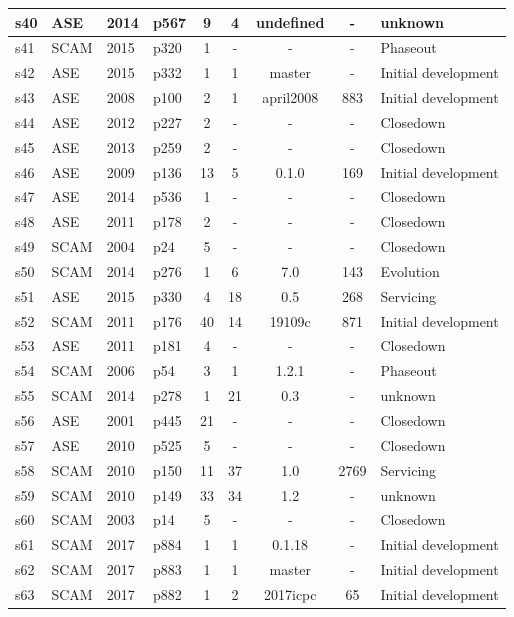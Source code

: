 \begin{longtable}{| l | l | l | l | c | c | c | c | l |}
    \hline
s40 & ASE & 2014 & p567 & 9 & 4 & undefined & - & unknown \\
    \hline
s41 & SCAM & 2015 & p320 & 1 & - & - & - & Phaseout \\
    \hline
s42 & ASE & 2015 & p332 & 1 & 1 & master & - & Initial development \\
    \hline
s43 & ASE & 2008 & p100 & 2 & 1 & april2008 & 883 & Initial development \\
    \hline
s44 & ASE & 2012 & p227 & 2 & - & - & - & Closedown \\
    \hline
s45 & ASE & 2013 & p259 & 2 & - & - & - & Closedown \\
    \hline
s46 & ASE & 2009 & p136 & 13 & 5 & 0.1.0 & 169 & Initial development \\
    \hline
s47 & ASE & 2014 & p536 & 1 & - & - & - & Closedown \\
    \hline
s48 & ASE & 2011 & p178 & 2 & - & - & - & Closedown \\
    \hline
s49 & SCAM & 2004 & p24 & 5 & - & - & - & Closedown \\
    \hline
s50 & SCAM & 2014 & p276 & 1 & 6 & 7.0 & 143 & Evolution \\
    \hline
s51 & ASE & 2015 & p330 & 4 & 18 & 0.5 & 268 & Servicing \\
    \hline
s52 & SCAM & 2011 & p176 & 40 & 14 & 19109c & 871 & Initial development \\
    \hline
s53 & ASE & 2011 & p181 & 4 & - & - & - & Closedown \\
    \hline
s54 & SCAM & 2006 & p54 & 3 & 1 & 1.2.1 & - & Phaseout \\
    \hline
s55 & SCAM & 2014 & p278 & 1 & 21 & 0.3 & - & unknown \\
    \hline
s56 & ASE & 2001 & p445 & 21 & - & - & - & Closedown \\
    \hline
s57 & ASE & 2010 & p525 & 5 & - & - & - & Closedown \\
    \hline
s58 & SCAM & 2010 & p150 & 11 & 37 & 1.0 & 2769 & Servicing \\
    \hline
s59 & SCAM & 2010 & p149 & 33 & 34 & 1.2 & - & unknown \\
    \hline
s60 & SCAM & 2003 & p14 & 5 & - & - & - & Closedown \\
    \hline
s61 & SCAM & 2017 & p884 & 1 & 1 & 0.1.18 & - & Initial development \\
    \hline
s62 & SCAM & 2017 & p883 & 1 & 1 & master & - & Initial development \\
    \hline
s63 & SCAM & 2017 & p882 & 1 & 2 & 2017icpc & 65 & Initial development \\

\end{longtable}
